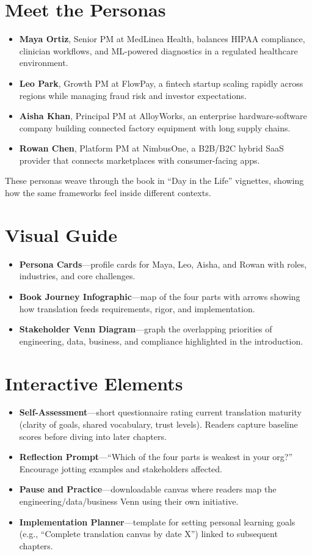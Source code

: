 \section{Meet the Personas}
\label{sec:intro-personas}
\begin{itemize}
    \item \textbf{Maya Ortiz}, Senior PM at MedLinea Health, balances HIPAA compliance, clinician workflows, and ML-powered diagnostics in a regulated healthcare environment.
    \item \textbf{Leo Park}, Growth PM at FlowPay, a fintech startup scaling rapidly across regions while managing fraud risk and investor expectations.
    \item \textbf{Aisha Khan}, Principal PM at AlloyWorks, an enterprise hardware-software company building connected factory equipment with long supply chains.
    \item \textbf{Rowan Chen}, Platform PM at NimbusOne, a B2B/B2C hybrid SaaS provider that connects marketplaces with consumer-facing apps.
\end{itemize}
These personas weave through the book in ``Day in the Life'' vignettes, showing how the same frameworks feel inside different contexts.

\section{Visual Guide}
\label{sec:intro-visuals}
\begin{itemize}
    \item \textbf{Persona Cards}—profile cards for Maya, Leo, Aisha, and Rowan with roles, industries, and core challenges.
    \item \textbf{Book Journey Infographic}—map of the four parts with arrows showing how translation feeds requirements, rigor, and implementation.
    \item \textbf{Stakeholder Venn Diagram}—graph the overlapping priorities of engineering, data, business, and compliance highlighted in the introduction.
\end{itemize}

\section{Interactive Elements}
\label{sec:intro-interactive}
\begin{itemize}
    \item \textbf{Self-Assessment}—short questionnaire rating current translation maturity (clarity of goals, shared vocabulary, trust levels). Readers capture baseline scores before diving into later chapters.
    \item \textbf{Reflection Prompt}—``Which of the four parts is weakest in your org?'' Encourage jotting examples and stakeholders affected.
    \item \textbf{Pause and Practice}—downloadable canvas where readers map the engineering/data/business Venn using their own initiative.
    \item \textbf{Implementation Planner}—template for setting personal learning goals (e.g., ``Complete translation canvas by date X'') linked to subsequent chapters.
\end{itemize}
